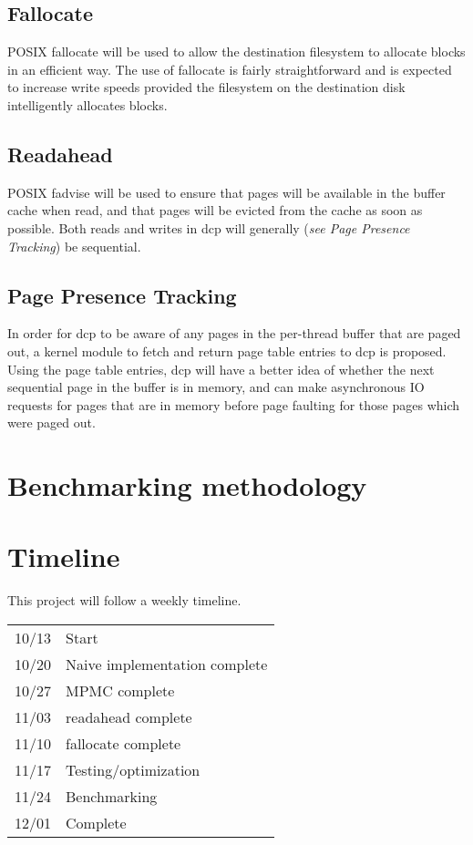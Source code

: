 \documentclass[12pt]{article}
\begin{document}
\subsection{Fallocate}
POSIX fallocate will be used to allow the destination filesystem to
allocate blocks in an efficient way. The use of fallocate is
fairly straightforward and is expected to increase write speeds
provided the filesystem on the destination disk intelligently
allocates blocks.

\subsection{Readahead}
POSIX fadvise will be used to ensure that pages will be available
in the buffer cache when read, and that pages will be evicted from
the cache as soon as possible. Both reads and writes in dcp will
generally (\textit{see Page Presence Tracking}) be sequential.

\subsection{Page Presence Tracking}
In order for dcp to be aware of any pages in the per-thread buffer that
are paged out, a kernel module to fetch and return page table entries to
dcp is proposed. Using the page table entries, dcp will have a better
idea of whether the next sequential page in the buffer is in memory,
and can make asynchronous IO requests for pages that are in memory
before page faulting for those pages which were paged out.

\section{Benchmarking methodology}

\section{Timeline}
This project will follow a weekly timeline. \\
\begin{tabular}{|l | l|}
\hline
10/13 & Start \\
10/20 & Naive implementation complete \\
10/27 & MPMC complete \\
11/03 & readahead complete \\
11/10 & fallocate complete \\
11/17 & Testing/optimization \\
11/24 & Benchmarking \\
12/01 & Complete \\
\hline
\end{tabular}




\end{document}
